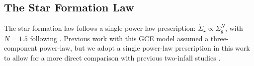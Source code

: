 \documentclass[twocolumn,twocolappendix,linenumbers]{aastex631}
\begin{document}
\subsection{The Star Formation Law}
\label{sec:sf-law}

The star formation law follows a single power-law prescription: $\dot\Sigma_\star\propto\Sigma_g^N$, with $N=1.5$ following \citet{kennicutt_global_1998}. Previous work with this GCE model \citep[e.g.,][]{johnson_stellar_2021,dubay_galactic_2024} assumed a three-component power-law, but we adopt a single power-law prescription in this work to allow for a more direct comparison with previous two-infall studies \citep[e.g.,][]{spitoni_remind_2024}. 

\end{document}
